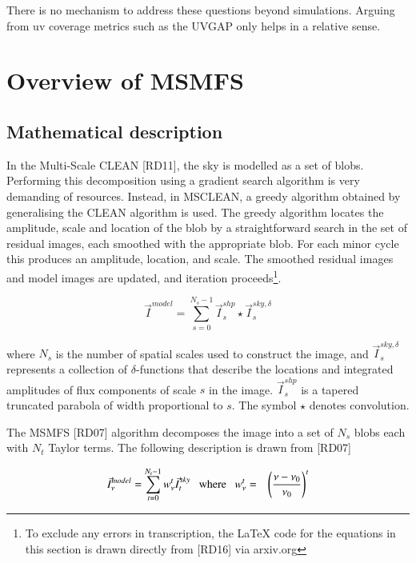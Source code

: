 \documentclass[11pt,a4paper,variablewidth]{article}
\begin{document}
There is no mechanism to address these questions beyond simulations. Arguing from uv coverage metrics such as the UVGAP only helps in a relative sense.


\clearpage

\section{Overview of MSMFS}
\label{sec:overview}

\subsection{Mathematical description}

In the Multi-Scale CLEAN [RD11], the sky is modelled as a set of blobs. Performing this decomposition using a gradient search algorithm is very demanding of resources. Instead, in MSCLEAN, a greedy algorithm obtained by generalising the CLEAN algorithm is used. The greedy algorithm locates the amplitude, scale and location of the blob by a straightforward search in the set of residual images, each smoothed with the appropriate blob. For each minor cycle this produces an amplitude, location, and scale. The smoothed residual images and model images are updated, and iteration proceeds\footnote{To exclude any errors in transcription, the LaTeX code for the equations in this section is drawn directly from [RD16] via arxiv.org}.

\begin{equation}
\vec{I}^{model} = \sum_{s=0}^{N_s-1}  \vec{I}^{shp}_{s} \star \vec{I}^{sky,\delta}_s
\label{Eq:ms_model}
\end{equation}

where $N_s$ is the number of spatial scales used to construct the image, and
$\vec{I}^{sky,\delta}_{s}$ represents a collection of $\delta$-functions that describe the locations
and integrated amplitudes of flux components of scale $s$ in the image. $\vec{I}^{shp}_s$ is a tapered truncated parabola of width proportional to $s$.
The symbol $\star$ denotes convolution. 

The MSMFS [RD07] algorithm decomposes the image into a set of $N_s$ blobs each with $N_t$ Taylor terms. The following description is drawn from [RD07]

\begin{eqnarray}
\label{eqn:mf_model}
\vec{I}^{model}_{\nu} = \sum_{t=0}^{N_t-1} {w_{\nu}^t} \vec{I}^{sky}_{t} ~~~\mathrm{where}~~~ {w_{\nu}^t}&=&{\left(\frac{\nu-\nu_0}{\nu_0}\right)}^t 
\end{eqnarray}
\end{document}
